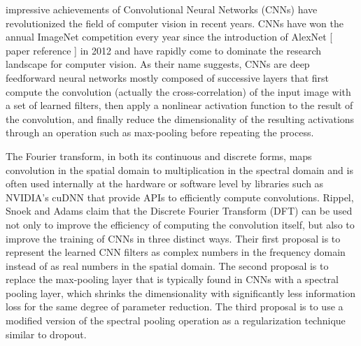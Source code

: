 \documentclass[10pt,journal,compsoc]{IEEEtran}
\begin{document}
%
%
%
%
 impressive achievements of Convolutional Neural Networks (CNNs) have revolutionized the field of computer vision in recent years. CNNs have won the annual ImageNet competition every year since the introduction of AlexNet [ paper reference ] in 2012 and have rapidly come to dominate the research landscape for computer vision. As their name suggests, CNNs are deep feedforward neural networks mostly composed of successive layers that first compute the convolution (actually the cross-correlation) of the input image with a set of learned filters, then apply a nonlinear activation function to the result of the convolution, and finally reduce the dimensionality of the resulting activations through an operation such as max-pooling before repeating the process.

The Fourier transform, in both its continuous and discrete forms, maps convolution in the spatial domain to multiplication in the spectral domain and is often used internally at the hardware or software level by libraries such as NVIDIA's cuDNN that provide APIs to efficiently compute convolutions. Rippel, Snoek and Adams claim that the Discrete Fourier Transform (DFT) can be used not only to improve the efficiency of computing the convolution itself, but also to improve the training of CNNs in three distinct ways. Their first proposal is to represent the learned CNN filters as complex numbers in the frequency domain instead of as real numbers in the spatial domain. The second proposal is to replace the max-pooling layer that is typically found in CNNs with a spectral pooling layer, which shrinks the dimensionality with significantly less information loss for the same degree of parameter reduction. The third proposal is to use a modified version 
of the spectral pooling operation as a regularization technique similar to dropout.
\end{document}
